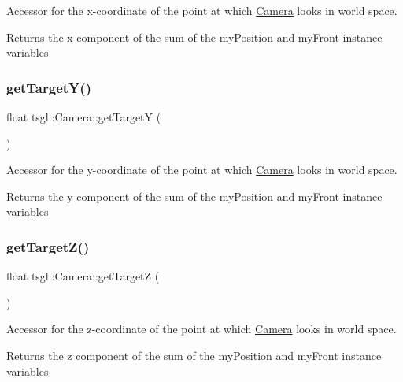 Accessor for the x-\/coordinate of the point at which \hyperlink{classtsgl_1_1_camera}{Camera} looks in world space. 

Returns the x component of the sum of the my\+Position and my\+Front instance variables \mbox{\label{classtsgl_1_1_camera_ac06e3f420e82af5189f525881191031b}} 
\subsubsection{\texorpdfstring{get\+Target\+Y()}{getTargetY()}}
{\footnotesize\ttfamily float tsgl\+::\+Camera\+::get\+TargetY (\begin{DoxyParamCaption}{ }\end{DoxyParamCaption})}



Accessor for the y-\/coordinate of the point at which \hyperlink{classtsgl_1_1_camera}{Camera} looks in world space. 

Returns the y component of the sum of the my\+Position and my\+Front instance variables \mbox{\label{classtsgl_1_1_camera_a1ceef7ca9535c701c7c70741c1170dea}} 
\subsubsection{\texorpdfstring{get\+Target\+Z()}{getTargetZ()}}
{\footnotesize\ttfamily float tsgl\+::\+Camera\+::get\+TargetZ (\begin{DoxyParamCaption}{ }\end{DoxyParamCaption})}



Accessor for the z-\/coordinate of the point at which \hyperlink{classtsgl_1_1_camera}{Camera} looks in world space. 

Returns the z component of the sum of the my\+Position and my\+Front instance variables \mbox{\label{classtsgl_1_1_camera_acb98691025f9ea89b63b06ee184409b4}} 
